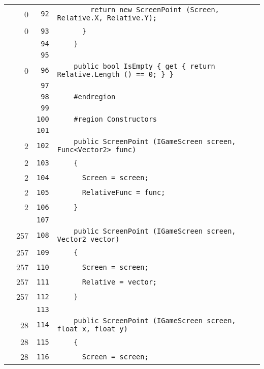\documentclass[a4paper,10pt]{article}
\begin{document}
\begin{longtable}[l]{lrrl}
\cellcolor{red} & 0 & \verb~92~ & \verb~        return new ScreenPoint (Screen, Relative.X, Relative.Y);~\\
\cellcolor{red} & 0 & \verb~93~ & \verb~      }~\\
\cellcolor{gray} &  & \verb~94~ & \verb~    }~\\
\cellcolor{gray} &  & \verb~95~ & \verb~~\\
\cellcolor{red} & 0 & \verb~96~ & \verb~    public bool IsEmpty { get { return Relative.Length () == 0; } }~\\
\cellcolor{gray} &  & \verb~97~ & \verb~~\\
\cellcolor{gray} &  & \verb~98~ & \verb~    #endregion~\\
\cellcolor{gray} &  & \verb~99~ & \verb~~\\
\cellcolor{gray} &  & \verb~100~ & \verb~    #region Constructors~\\
\cellcolor{gray} &  & \verb~101~ & \verb~~\\
\cellcolor{green} & 2 & \verb~102~ & \verb~    public ScreenPoint (IGameScreen screen, Func<Vector2> func)~\\
\cellcolor{green} & 2 & \verb~103~ & \verb~    {~\\
\cellcolor{green} & 2 & \verb~104~ & \verb~      Screen = screen;~\\
\cellcolor{green} & 2 & \verb~105~ & \verb~      RelativeFunc = func;~\\
\cellcolor{green} & 2 & \verb~106~ & \verb~    }~\\
\cellcolor{gray} &  & \verb~107~ & \verb~~\\
\cellcolor{green} & 257 & \verb~108~ & \verb~    public ScreenPoint (IGameScreen screen, Vector2 vector)~\\
\cellcolor{green} & 257 & \verb~109~ & \verb~    {~\\
\cellcolor{green} & 257 & \verb~110~ & \verb~      Screen = screen;~\\
\cellcolor{green} & 257 & \verb~111~ & \verb~      Relative = vector;~\\
\cellcolor{green} & 257 & \verb~112~ & \verb~    }~\\
\cellcolor{gray} &  & \verb~113~ & \verb~~\\
\cellcolor{green} & 28 & \verb~114~ & \verb~    public ScreenPoint (IGameScreen screen, float x, float y)~\\
\cellcolor{green} & 28 & \verb~115~ & \verb~    {~\\
\cellcolor{green} & 28 & \verb~116~ & \verb~      Screen = screen;~\\

\end{longtable}
\end{document}
